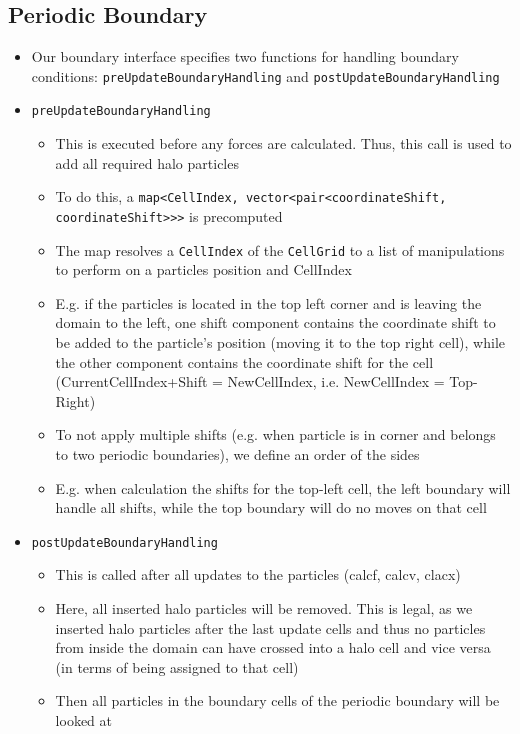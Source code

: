 \documentclass{article}
\begin{document}
\subsection{Periodic Boundary}
\label{sec:rayleigh:periodic}
\begin{itemize}
    \item Our boundary interface specifies two functions for handling boundary conditions: \texttt{preUpdateBoundaryHandling} and \texttt{postUpdateBoundaryHandling}
    \item \texttt{preUpdateBoundaryHandling}
    \begin{itemize}
        \item This is executed before any forces are calculated. Thus, this call is used to add all required halo particles
        \item To do this, a \texttt{map<CellIndex, vector<pair<coordinateShift, coordinateShift>>>} is precomputed
        \item The map resolves a \texttt{CellIndex} of the \texttt{CellGrid} to a list of manipulations to perform on a particles position and CellIndex
        \item E.g. if the particles is located in the top left corner and is leaving the domain to the left, one shift component contains the coordinate shift to be added to the particle's position (moving it to the top right cell), while the other component contains the coordinate shift for the cell (CurrentCellIndex+Shift = NewCellIndex, i.e. NewCellIndex = Top-Right)
        \item To not apply multiple shifts (e.g. when particle is in corner and belongs to two periodic boundaries), we define an order of the sides
        \item E.g. when calculation the shifts for the top-left cell, the left boundary will handle all shifts, while the top boundary will do no moves on that cell
    \end{itemize}
    \item \texttt{postUpdateBoundaryHandling}
    \begin{itemize}
        \item This is called after all updates to the particles (calcf, calcv, clacx)
        \item Here, all inserted halo particles will be removed. This is legal, as we inserted halo particles after the last update cells and thus no particles from inside the domain can have crossed into a halo cell and vice versa (in terms of being assigned to that cell)
        \item Then all particles in the boundary cells of the periodic boundary will be looked at

\end{itemize}
\end{itemize}
\end{document}
